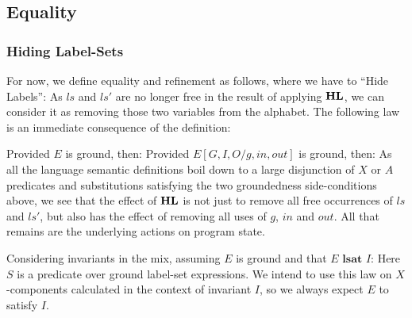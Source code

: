 \subsection{Equality}\label{ssec:equality}

\subsubsection{Hiding Label-Sets}\label{sssec:HL}

For now, we define equality and refinement as follows,
where we have to ``Hide Labels'':
As $ls$ and $ls'$ are no longer free in the result of applying $\mathbf{HL}$,
we can consider it as removing those two variables from the alphabet.
The following law is an immediate consequence of the definition:

Provided $E$ is ground, then:
Provided $E[G,I,O/g,in,out]$ is ground, then:
As all the language semantic definitions boil down to a large
disjunction of $X$ or $A$ predicates and substitutions satisfying
the two groundedness side-conditions above,
we see that the effect of $\mathbf{HL}$ is not just to remove
all free occurrences of $ls$ and $ls'$,
but also has the effect of removing all uses of $g$, $in$ and $out$.
All that remains are the underlying actions on program state.

Considering invariants in the mix, assuming $E$ is ground
and that $E \textbf{ lsat } I$:
Here $S$ is a predicate over ground label-set expressions.
We intend to use this law on $X$-components calculated in the
context of invariant $I$, so we always expect $E$ to satisfy $I$.

